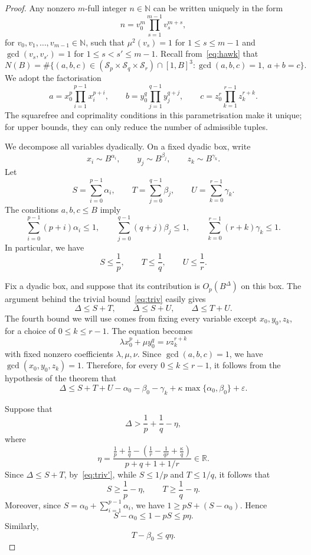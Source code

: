 \documentclass[a4paper,11pt,twoside,reqno]{amsart}
\theoremstyle{definition}
\theoremstyle{remark}
\numberwithin{equation}{section}
\newcommand\ve{\varepsilon}
\newcommand\R{\mathbb{R}}
\newcommand\1{\mathbf{1}}
\renewcommand{\leq}{\leqslant}
\renewcommand{\le}{\leqslant}
\renewcommand{\ge}{\geqslant}
\begin{document}
\begin{proof}
Any nonzero $m$-full integer $n\in \mathbb{N}$ can be written uniquely in the form
\[
n = v_0^{m} \prod_{s = 1}^{m-1} v_s^{m + s},
\]
for $v_0, v_1, \ldots, v_{m - 1} \in \mathbb{N}$, such that $\mu^2(v_s) =1$ for $1 \leq s \leq m-1$ and $\gcd(v_s, v_{s'}) = 1$ for $1 \leq s < s' \leq m-1$.
Recall 
from~\eqref{eq:hawk} that 
\[
N(B)=\#\{(a,b,c)\in (\mathcal{S}_p\times \mathcal{S}_q\times \mathcal{S}_r)\cap[1,B]^3: \gcd(a,b,c)=1,~a+b=c\}.
\]
We adopt the factorisation
\[
a=x_0^p\prod_{i=1}^{p-1}x_i^{p+i},\qquad
b=y_0^q\prod_{j=1}^{q-1}y_j^{q+j},\qquad
c=z_0^r\prod_{k=1}^{r-1}z_k^{r+k}.
\]
The squarefree and coprimality conditions in this parametrisation make it unique;
for upper bounds, they can only reduce the number of admissible tuples. 

We decompose all variables dyadically. On a fixed dyadic box, write
\[
x_i\sim B^{\alpha_i},\qquad y_j\sim B^{\beta_j},\qquad z_k\sim B^{\gamma_k}.
\]
Let
\begin{equation}\label{eq:UVW}
S=\sum_{i=0}^{p-1}\alpha_i,\qquad
T=\sum_{j=0}^{q-1}\beta_j,\qquad
U=\sum_{k=0}^{r-1}\gamma_k.
\end{equation}
The conditions $a,b,c\le B$ imply
\[
\sum_{i=0}^{p-1}(p+i)\alpha_i\le 1,\qquad
\sum_{j=0}^{q-1}(q+j)\beta_j\le 1,\qquad
\sum_{k=0}^{r-1}(r+k)\gamma_k\le 1.
\]
In particular, we have 
\[
S\le \frac1p,\qquad T\le \frac1q,\qquad U\le \frac1r.
\]

Fix a dyadic box, and suppose that its contribution is
$O_{p}(B^{\Delta})$ on this box. 
The argument behind the trivial bound~\eqref{eq:triv} easily gives
\begin{equation}\label{eq:triv'}
\Delta\le S+T,\qquad \Delta\le S+U,\qquad \Delta\le T+U.
\end{equation}
The fourth bound we will use comes from fixing every variable except $x_0,y_0,z_k$, for a choice of $0\le k\le r-1$. The equation becomes
\[
\lambda x_0^p+\mu y_0^q=\nu z_k^{r+k}
\]
with fixed nonzero coefficients $\lambda,\mu,\nu$. Since $\gcd(a,b,c)=1$, we have
$\gcd(x_0,y_0,z_k)=1$. Therefore, for every $0\le k\le r-1$, it follows from the hypothesis of the theorem that 
\begin{equation}\label{eq:4way}
\Delta
\le
S+T+U-\alpha_0-\beta_0-\gamma_k
+\kappa\max\{\alpha_0,\beta_0\}+\ve.
\end{equation}

Suppose that
\[
\Delta> \frac 1p+\frac 1q-\eta,
\]
where 
\[
\eta=
 \frac{
 \displaystyle
 \frac1p+\frac1q-
 \left(
 \frac1r-\frac1{qr}+\frac{\kappa}q
 \right)}
 {p+q+1+1/r}\in \R. 
\]
Since $\Delta\le S+T$, by~\eqref{eq:triv'}, 
while $S\le 1/p$ and $T\le 1/q$, it follows that 
\[
S\ge \frac1p-\eta,\qquad T\ge \frac1q-\eta.
\]
Moreover, since $S=\alpha_0+\sum_{i=1}^{p-1}\alpha_i$, we have
$
1\ge pS+(S-\alpha_0).
$
Hence
\begin{equation}\label{eq:Ua0}
 S-\alpha_0\le 1-pS\le p\eta.
\end{equation}
Similarly,
\begin{equation}\label{eq:Vb0}
T-\beta_0\le q\eta.
\end{equation}


\end{proof}
\end{document}
